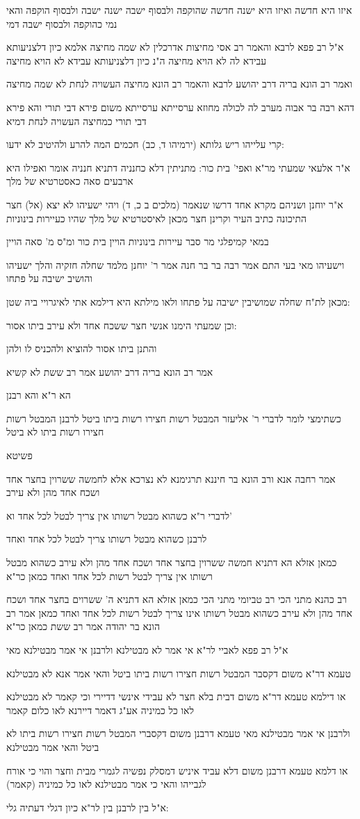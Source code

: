 \documentclass[12pt, openany]{book}
\newcommand{\sethebfont}{
\fontsize{10.5pt}{21.0pt} \selectfont
}
\newcommand{\textblock}[1]{
{\sethebfont #1\\}	
}
\begin{document}
\textblock{איזו היא חדשה ואיזו היא ישנה חדשה שהוקפה ולבסוף ישבה ישנה ישבה ולבסוף הוקפה והאי נמי כהוקפה ולבסוף ישבה דמי}
\textblock{א"ל רב פפא לרבא והאמר רב אסי מחיצות אדרכלין לא שמה מחיצה אלמא כיון דלצניעותא עבידא לה לא הויא מחיצה ה"נ כיון דלצניעותא עבידא לא הויא מחיצה}
\textblock{ואמר רב הונא בריה דרב יהושע לרבא והאמר רב הונא מחיצה העשויה לנחת לא שמה מחיצה}
\textblock{דהא רבה בר אבוה מערב לה לכולה מחוזא ערסייתא ערסייתא משום פירא דבי תורי והא פירא דבי תורי כמחיצה העשויה לנחת דמיא}
\textblock{קרי עלייהו ריש גלותא (ירמיהו ד, כב) חכמים המה להרע ולהיטיב לא ידעו:}
\textblock{א"ר אלעאי שמעתי מר"א ואפי' בית כור: מתניתין דלא כחנניה דתניא חנניה אומר ואפילו היא ארבעים סאה כאסטרטיא של מלך}
\textblock{א"ר יוחנן ושניהם מקרא אחד דרשו שנאמר (מלכים ב כ, ד) ויהי ישעיהו לא יצא (אל) חצר התיכונה כתיב העיר וקרינן חצר מכאן לאיסטרטיא של מלך שהיו כעיירות בינוניות}
\textblock{במאי קמיפלגי מר סבר עיירות בינוניות הויין בית כור ומ"ס מ' סאה הויין}
\textblock{וישעיהו מאי בעי התם אמר רבה בר בר חנה אמר ר' יוחנן מלמד שחלה חזקיה והלך ישעיהו והושיב ישיבה על פתחו}
\textblock{מכאן לת"ח שחלה שמושיבין ישיבה על פתחו ולאו מילתא היא דילמא אתי לאיגרויי ביה שטן:}
\textblock{וכן שמעתי הימנו אנשי חצר ששכח אחד ולא עירב ביתו אסור:}
\textblock{והתנן ביתו אסור להוציא ולהכניס לו ולהן}
\textblock{אמר רב הונא בריה דרב יהושע אמר רב ששת לא קשיא}
\textblock{הא ר"א והא רבנן}
\textblock{כשתימצי לומר לדברי ר' אליעזר המבטל רשות חצירו רשות ביתו ביטל לרבנן המבטל רשות חצירו רשות ביתו לא ביטל}
\textblock{פשיטא}
\textblock{אמר רחבה אנא ורב הונא בר חיננא תרגימנא לא נצרכא אלא לחמשה ששרוין בחצר אחד ושכח אחד מהן ולא עירב}
\textblock{לדברי ר"א כשהוא מבטל רשותו אין צריך לבטל לכל אחד וא'}
\textblock{לרבנן כשהוא מבטל רשותו צריך לבטל לכל אחד ואחד}
\textblock{כמאן אזלא הא דתניא חמשה ששרוין בחצר אחד ושכח אחד מהן ולא עירב כשהוא מבטל רשותו אין צריך לבטל רשות לכל אחד ואחד כמאן כר"א}
\textblock{רב כהנא מתני הכי רב טביומי מתני הכי כמאן אזלא הא דתניא ה' ששרוים בחצר אחד ושכח אחד מהן ולא עירב כשהוא מבטל רשותו אינו צריך לבטל רשות לכל אחד ואחד כמאן אמר רב הונא בר יהודה אמר רב ששת כמאן כר"א}
\textblock{א"ל רב פפא לאביי לר"א אי אמר לא מבטילנא ולרבנן אי אמר מבטילנא מאי}
\textblock{טעמא דר"א משום דקסבר המבטל רשות חצירו רשות ביתו ביטל והאי אמר אנא לא מבטילנא}
\textblock{או דילמא טעמא דר"א משום דבית בלא חצר לא עבידי אינשי דדיירי וכי קאמר לא מבטילנא לאו כל כמיניה אע"ג דאמר דיירנא לאו כלום קאמר}
\textblock{ולרבנן אי אמר מבטילנא מאי טעמא דרבנן משום דקסברי המבטל רשות חצירו רשות ביתו לא ביטל והאי אמר מבטילנא}
\textblock{או דלמא טעמא דרבנן משום דלא עביד איניש דמסלק נפשיה לגמרי מבית וחצר והוי כי אורח לגבייהו והאי כי אמר מבטילנא לאו כל כמיניה (קאמר)}
\textblock{א"ל בין לרבנן בין לר"א כיון דגלי דעתיה גלי:}
\end{document}
